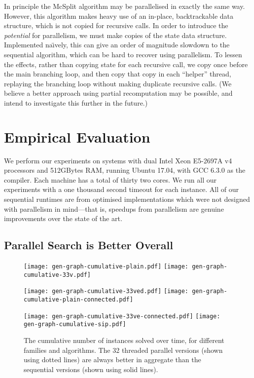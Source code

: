\documentclass{llncs}
\begin{document}
In principle the McSplit algorithm may be parallelised in exactly the same way. However, this
algorithm makes heavy use of an in-place, backtrackable data structure, which is not copied for
recursive calls. In order to introduce the \emph{potential} for parallelism, we must make
copies of the state data structure. Implemented na{\"\i}vely, this can give an order of magnitude
slowdown to the sequential algorithm, which can be hard to recover using parallelism. To lessen the
effects, rather than copying state for each recursive call, we copy once before the main branching
loop, and then copy that copy in each ``helper'' thread, replaying the branching loop without making
duplicate recursive calls.  (We believe a better approach using partial recomputation may be
possible, and intend to investigate this further in the future.)

\section{Empirical Evaluation}

We perform our experiments on systems with dual Intel Xeon E5-2697A v4 processors and 512GBytes RAM,
running Ubuntu 17.04, with GCC 6.3.0 as the compiler. Each machine has a total of thirty two cores.
We run all our experiments with a one thousand second timeout for each instance. All of our
sequential runtimes are from optimised implementations which were not designed with parallelism in
mind---that is, speedups from parallelism are genuine improvements over the state of the art.

\subsection{Parallel Search is Better Overall}

\begin{figure}[p]
    \texttt{[image: gen-graph-cumulative-plain.pdf]}
    \hfill
    \texttt{[image: gen-graph-cumulative-33v.pdf]}

    \vspace*{1em}

    \texttt{[image: gen-graph-cumulative-33ved.pdf]}
    \hfill
    \texttt{[image: gen-graph-cumulative-plain-connected.pdf]}

    \vspace*{1em}

    \texttt{[image: gen-graph-cumulative-33ve-connected.pdf]}
    \hfill
    \texttt{[image: gen-graph-cumulative-sip.pdf]}

    \caption{The cumulative number of instances solved over time, for different families and
    algorithms. The 32 threaded parallel versions (shown using dotted lines) are always better in
aggregate than the sequential versions (shown using solid lines).}\label{figure:cumulative}
\end{figure}
\end{document}
